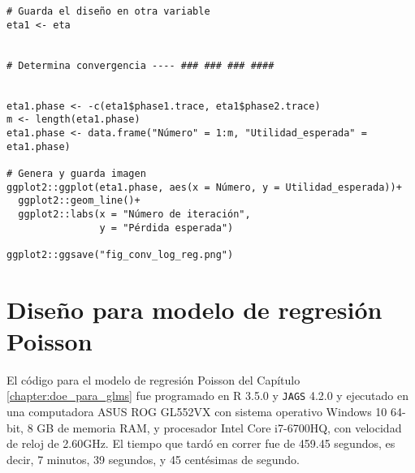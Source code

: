 \begin{lstlisting}
# Guarda el diseño en otra variable
eta1 <- eta


# Determina convergencia ---- ### ### ### ####


eta1.phase <- -c(eta1$phase1.trace, eta1$phase2.trace)
m <- length(eta1.phase)
eta1.phase <- data.frame("Número" = 1:m, "Utilidad_esperada" = eta1.phase)

# Genera y guarda imagen
ggplot2::ggplot(eta1.phase, aes(x = Número, y = Utilidad_esperada))+
  ggplot2::geom_line()+
  ggplot2::labs(x = "Número de iteración",
                y = "Pérdida esperada")

ggplot2::ggsave("fig_conv_log_reg.png")
\end{lstlisting}





\newpage

\section{Diseño para modelo de regresión Poisson}



El código para el modelo de regresión Poisson del Capítulo \ref{chapter:doe_para_glms} fue programado en \textsf{R} 3.5.0 \citep{R} y \texttt{JAGS} 4.2.0 \citep{jags} y ejecutado en una computadora ASUS ROG GL552VX con sistema operativo Windows 10 64-bit, 8 GB de memoria RAM, y procesador Intel Core i7-6700HQ, con velocidad de reloj de 2.60GHz. El tiempo que tardó en correr fue de 459.45 segundos, es decir, 7 minutos, 39 segundos, y 45 centésimas de segundo.

